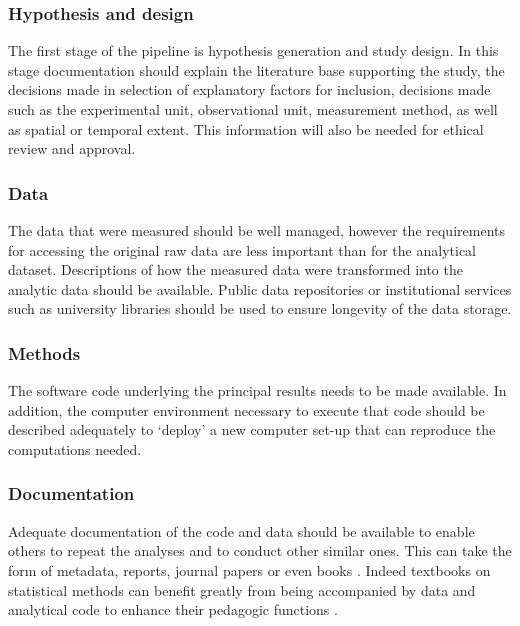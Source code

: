 \documentclass[11pt,a4paper]{article}
\begin{document}
\subsubsection{Hypothesis and design}\label{hypothesis-and-design}

The first stage of the pipeline is hypothesis generation and study
design. In this stage documentation should explain the literature base
supporting the study, the decisions made in selection of explanatory
factors for inclusion, decisions made such as the experimental unit,
observational unit, measurement method, as well as spatial or temporal
extent. This information will also be needed for ethical review and
approval.

\subsubsection{Data}\label{data}

The data that were measured should be well managed, however the
requirements for accessing the original raw data are less important than
for the analytical dataset. Descriptions of how the measured data were
transformed into the analytic data should be available. Public data
repositories or institutional services such as university libraries
should be used to ensure longevity of the data storage.

\subsubsection{Methods}\label{methods}

The software code underlying the principal results needs to be made
available. In addition, the computer environment necessary to execute
that code should be described adequately to `deploy' a new computer
set-up that can reproduce the computations needed.

\subsubsection{Documentation}\label{documentation}

Adequate documentation of the code and data should be available to
enable others to repeat the analyses and to conduct other similar ones.
This can take the form of metadata, reports, journal 
papers or even books \citep{Peng2008a}. Indeed textbooks on statistical methods can benefit greatly from being accompanied by data and analytical code to enhance their pedagogic functions  \citep{Barnett2015,Barnett2010}.
\end{document}
